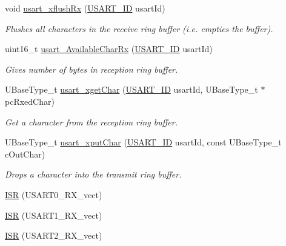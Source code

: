 \begin{DoxyCompactItemize}
void \hyperlink{group__usart_async_module_ga70e50f1bc6f1abd0cb57c53145a0f06e}{usart\+\_\+xflush\+Rx} (\hyperlink{group__usart_async_module_gaae3c5ea77a411e5f40e4377f77067b86}{U\+S\+A\+R\+T\+\_\+\+ID} usart\+Id)
\begin{DoxyCompactList}\small\item\em Flushes all characters in the receive ring buffer (i.\+e. empties the buffer). \end{DoxyCompactList}\item 
uint16\+\_\+t \hyperlink{group__usart_async_module_gae7ed1c85cf0d965f00c8b8b1adc87621}{usart\+\_\+\+Available\+Char\+Rx} (\hyperlink{group__usart_async_module_gaae3c5ea77a411e5f40e4377f77067b86}{U\+S\+A\+R\+T\+\_\+\+ID} usart\+Id)
\begin{DoxyCompactList}\small\item\em Gives number of bytes in reception ring buffer. \end{DoxyCompactList}\item 
U\+Base\+Type\+\_\+t \hyperlink{group__usart_async_module_ga3958a2e258e69977428337f1b79b559d}{usart\+\_\+xget\+Char} (\hyperlink{group__usart_async_module_gaae3c5ea77a411e5f40e4377f77067b86}{U\+S\+A\+R\+T\+\_\+\+ID} usart\+Id, U\+Base\+Type\+\_\+t $\ast$pc\+Rxed\+Char)
\begin{DoxyCompactList}\small\item\em Get a character from the reception ring buffer. \end{DoxyCompactList}\item 
U\+Base\+Type\+\_\+t \hyperlink{group__usart_async_module_ga520a2c4212a37daf9f42e747a7ff420f}{usart\+\_\+xput\+Char} (\hyperlink{group__usart_async_module_gaae3c5ea77a411e5f40e4377f77067b86}{U\+S\+A\+R\+T\+\_\+\+ID} usart\+Id, const U\+Base\+Type\+\_\+t c\+Out\+Char)
\begin{DoxyCompactList}\small\item\em Drops a character into the transmit ring buffer. \end{DoxyCompactList}\item 
\hyperlink{group__usart_async_module_ga084f0a9cf05b1877bd8a71a90dae7ff8}{I\+SR} (U\+S\+A\+R\+T0\+\_\+\+R\+X\+\_\+vect)
\item 
\hyperlink{group__usart_async_module_gae6e8a8009a9ae0c59f25a496d1cf5a84}{I\+SR} (U\+S\+A\+R\+T1\+\_\+\+R\+X\+\_\+vect)
\item 
\hyperlink{group__usart_async_module_ga63a86aad9ba2e355fe6380da553f554e}{I\+SR} (U\+S\+A\+R\+T2\+\_\+\+R\+X\+\_\+vect)
\item 

\end{DoxyCompactItemize}
